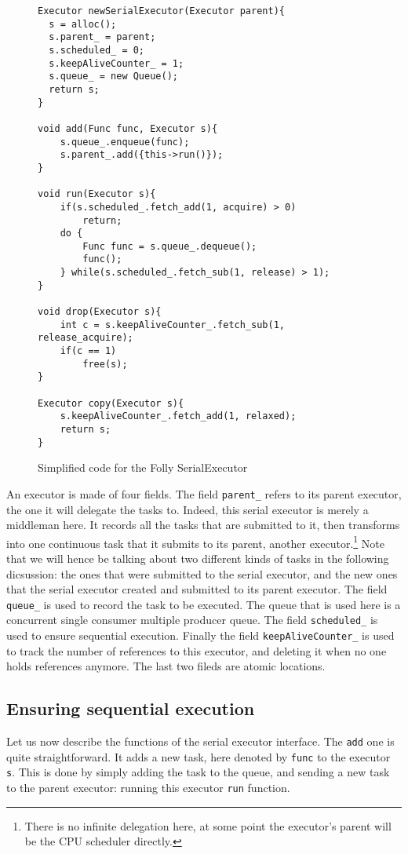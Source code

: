 \begin{figure}
	\begin{lstlisting}
Executor newSerialExecutor(Executor parent){
  s = alloc();
  s.parent_ = parent;
  s.scheduled_ = 0;
  s.keepAliveCounter_ = 1;
  s.queue_ = new Queue();
  return s;
}

void add(Func func, Executor s){
	s.queue_.enqueue(func);
	s.parent_.add({this->run()});
}

void run(Executor s){
	if(s.scheduled_.fetch_add(1, acquire) > 0)
		return;
	do {
		Func func = s.queue_.dequeue();
		func();
	} while(s.scheduled_.fetch_sub(1, release) > 1);
}

void drop(Executor s){
	int c = s.keepAliveCounter_.fetch_sub(1, release_acquire);
	if(c == 1)
		free(s);
}

Executor copy(Executor s){
	s.keepAliveCounter_.fetch_add(1, relaxed);
	return s;
}
	\end{lstlisting}
\label{fig:simplSerialExec}
		\caption{Simplified code for the Folly SerialExecutor}
\end{figure}


An executor is made of four fields. The field \texttt{parent\_} refers to its parent executor, the one it will delegate the tasks to. Indeed, this serial executor is merely a middleman here. It records all the tasks that are submitted to it, then transforms into one continuous task that it submits to its parent, another executor.\footnote{There is no infinite delegation here, at some point the executor's parent will be the CPU scheduler directly.} Note that we will hence be talking about two different kinds of tasks in the following dicsussion: the ones that were submitted to the serial executor, and the new ones that the serial executor created and submitted to its parent executor. The field \texttt{queue\_} is used to record the task to be executed. The queue that is used here is a concurrent single consumer multiple producer queue. The field \texttt{scheduled\_} is used to ensure sequential execution. Finally the field \texttt{keepAliveCounter\_} is used to track the number of references to this executor, and deleting it when no one holds references anymore. The last two fileds are atomic locations.

\subsection{Ensuring sequential execution}
Let us now describe the functions of the serial executor interface. The \texttt{add} one is quite straightforward. It adds a new task, here denoted by \texttt{func} to the executor \texttt{s}. This is done by simply adding the task to the queue, and sending a new task to the parent executor: running this executor \texttt{run} function. 

